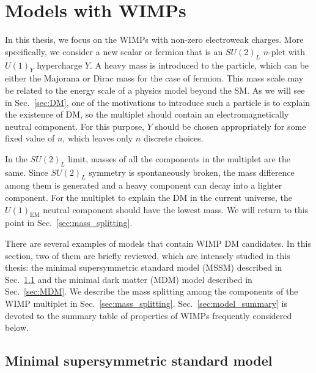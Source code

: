 \documentclass[12pt,twoside,book]{article}
\begin{document}
\section{Models with WIMPs}
\setcounter{equation}{0}
\label{sec:model}

\vskip 0.1in

In this thesis, we focus on the WIMPs with non-zero electroweak charges.
More specifically, we consider a new scalar or fermion that is an $SU(2)_L$ $n$-plet with $U(1)_Y$ hypercharge $Y$.
A heavy mass is introduced to the particle, which can be either the Majorana or Dirac mass for the case of fermion.
This mass scale may be related to the energy scale of a physics model beyond the SM.
As we will see in Sec.~\ref{sec:DM}, one of the motivations to introduce such a particle is to explain the existence of DM, so the multiplet should contain an electromagnetically neutral component.
For this purpose, $Y$ should be chosen appropriately for some fixed value of $n$, which leaves only $n$ discrete choices.

In the $SU(2)_L$ limit, masses of all the components in the multiplet are the same.
Since $SU(2)_L$ symmetry is spontaneously broken, the mass difference among them is generated and a heavy component can decay into a lighter component.
For the multiplet to explain the DM in the current universe, the $U(1)_{\mathrm{EM}}$ neutral component should have the lowest mass.
We will return to this point in Sec.~\ref{sec:mass_splitting}.

There are several examples of models that contain WIMP DM candidates.
In this section, two of them are briefly reviewed, which are intensely studied in this thesis: the minimal supersymmetric standard model (MSSM) described in Sec.~\ref{sec:MSSM} and the minimal dark matter (MDM) model described in Sec.~\ref{sec:MDM}.
We describe the mass splitting among the components of the WIMP multiplet in Sec.~\ref{sec:mass_splitting}.
Sec.~\ref{sec:model_summary} is devoted to the summary table of properties of WIMPs frequently considered below.

\subsection{Minimal supersymmetric standard model}
\label{sec:MSSM}
\end{document}
